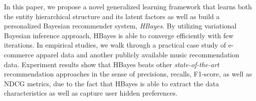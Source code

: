 In this paper, we propose a novel generalized learning framework that learns both the entity hierarchical structure and its latent factors as well as build a personalized Bayesian recommender system, \emph{HBayes}.  
By utilizing variational Bayesian inference approach, HBayes is able to converge efficiently with few iterations.  In empirical studies, we walk through a practical case study of e-commerce apparel data and another publicly available music recommendation data.  Experiment results show that HBayes beats other \emph{state-of-the-art} recommendation approaches in the sense of precisions, recalls, F1-score, as well as NDCG metrics, due to the fact that HBayes is able to extract the data characteristics as well as capture user hidden preferences.   